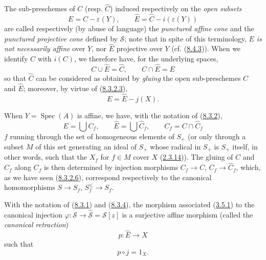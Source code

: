 \begin{env}[8.3.4]
\label{II.8.3.4}
The sub-preschemes of $C$ (resp. $\widehat{C}$) induced respectively on
the \emph{open subsets}
\begin{equation}
\label{II.8.3.4.1}
  E=C-\varepsilon(Y),\qquad
  \widehat{E}=\widehat{C}-i(\varepsilon(Y))
\tag{8.3.4.1}
\end{equation}
are called respectively (by abuse of language) the \emph{punctured affine
cone} and the \emph{punctured projective cone} defined by $\mathcal{S}$; note
that in spite of this terminology, $E$ \emph{is not necessarily
affine} over $Y$, nor $\widehat{E}$ projective over $Y$
(cf. (\hyperref[II.8.4.3]{8.4.3})). When we identify $C$ with $i(C)$, we
therefore have, for the underlying spaces,
\begin{equation}
\label{II.8.3.4.2}
  C\cup\widehat{E}=\widehat{C},\qquad C\cap\widehat{E}=E
\tag{8.3.4.2}
\end{equation}
so that $\widehat{C}$ can be considered as obtained by
\emph{gluing} the open sub-preschemes $C$ and $\widehat{E}$; moreover,
by virtue of (\hyperref[II.8.3.2.3]{8.3.2.3}),
\begin{equation}
\label{II.8.3.4.3}
  E=\widehat{E}-j(X).
\tag{8.3.4.3}
\end{equation}

When $Y=\operatorname{Spec}(A)$ is affine, we have, with the notation of
(\hyperref[II.8.3.2]{8.3.2}),
\begin{equation}
\label{II.8.3.4.4}
  E=\bigcup C_f,\qquad
  \widehat{E}=\bigcup\widehat{C}_f,\qquad
  C_f=C\cap\widehat{C}_f
\tag{8.3.4.4}
\end{equation}
$f$ running through the set of homogeneous elements of $S_+$ (or only through a
subset $M$ of this set generating an ideal of $S_+$ whose radical in
$S_+$ is $S_+$ itself, in other words, such that the $X_f$ for $f\in M$
cover $X$ (\hyperref[II.2.3.14]{2.3.14})). The gluing of $C$ and
$\widehat{C}_f$ along $C_f$ is then determined by injection morphisms
$C_f\to C$, $C_f\to\widehat{C}_f$, which, as we have seen
(\hyperref[II.8.3.2.6]{8.3.2.6}), correspond respectively to the
canonical homomorphisms $S\to S_f$, $S_f^{\leq}\to S_f$.
\end{env}

\begin{proposition}[8.3.5]
\label{II.8.3.5}
With the notation of (\hyperref[II.8.3.1]{8.3.1}) and
(\hyperref[II.8.3.4]{8.3.4}), the morphism associated
(\hyperref[II.3.5.1]{3.5.1}) to the canonical injection
$\varphi:\mathcal{S}\to\widehat{\mathcal{S}}=\mathcal{S}[z]$ is a surjective
affine morphism (called the \emph{canonical retraction})
\begin{equation}
\label{II.8.3.5.1}
  p:\widehat{E}\to X
\tag{8.3.5.1}
\end{equation}
such that
\begin{equation}
\label{II.8.3.5.2}
  p\circ j=1_X.
\tag{8.3.5.2}
\end{equation}
\end{proposition}


